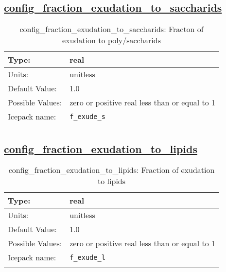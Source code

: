 \subsection[config\_fraction\_exudation\_to\_saccharids]{\hyperref[sec:nm_tab_biogeochemistry]{config\_fraction\_exudation\_to\_saccharids}}
\label{subsec:nm_sec_config_fraction_exudation_to_saccharids}
\begin{center}
\begin{longtable}{| p{2.0in} || p{4.0in} |}
    \hline
    Type: & real \\
    \hline
    Units: & \si{unitless} \\
    \hline
    Default Value: & 1.0 \\
    \hline
    Possible Values: & zero or positive real less than or equal to 1 \\
    \hline
    Icepack name: & \verb+f_exude_s+ \\
    \hline
    \caption{config\_fraction\_exudation\_to\_saccharids: Fracton of exudation to poly/saccharids}
\end{longtable}
\end{center}
\subsection[config\_fraction\_exudation\_to\_lipids]{\hyperref[sec:nm_tab_biogeochemistry]{config\_fraction\_exudation\_to\_lipids}}
\label{subsec:nm_sec_config_fraction_exudation_to_lipids}
\begin{center}
\begin{longtable}{| p{2.0in} || p{4.0in} |}
    \hline
    Type: & real \\
    \hline
    Units: & \si{unitless} \\
    \hline
    Default Value: & 1.0 \\
    \hline
    Possible Values: & zero or positive real less than or equal to 1 \\
    \hline
    Icepack name: & \verb+f_exude_l+ \\
    \hline
    \caption{config\_fraction\_exudation\_to\_lipids: Fraction of exudation to lipids}
\end{longtable}
\end{center}
